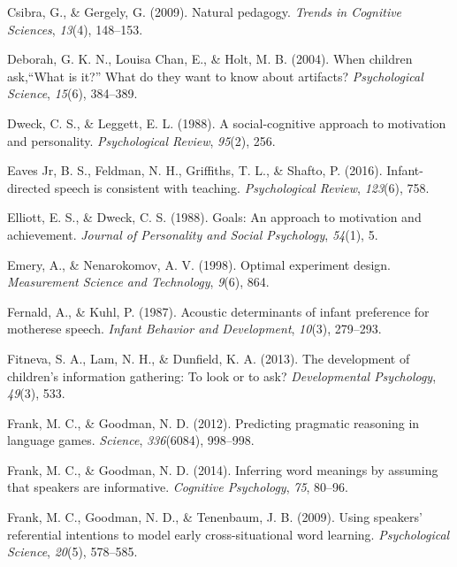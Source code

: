 \documentclass[oneside]{report}
\begin{document}
\leavevmode\hypertarget{ref-csibra2009natural}{}%
Csibra, G., \& Gergely, G. (2009). Natural pedagogy. \emph{Trends in
Cognitive Sciences}, \emph{13}(4), 148--153.

\leavevmode\hypertarget{ref-deborah2004children}{}%
Deborah, G. K. N., Louisa Chan, E., \& Holt, M. B. (2004). When children
ask,``What is it?'' What do they want to know about artifacts?
\emph{Psychological Science}, \emph{15}(6), 384--389.

\leavevmode\hypertarget{ref-dweck1988social}{}%
Dweck, C. S., \& Leggett, E. L. (1988). A social-cognitive approach to
motivation and personality. \emph{Psychological Review}, \emph{95}(2),
256.

\leavevmode\hypertarget{ref-eaves2016infant}{}%
Eaves Jr, B. S., Feldman, N. H., Griffiths, T. L., \& Shafto, P. (2016).
Infant-directed speech is consistent with teaching. \emph{Psychological
Review}, \emph{123}(6), 758.

\leavevmode\hypertarget{ref-elliott1988goals}{}%
Elliott, E. S., \& Dweck, C. S. (1988). Goals: An approach to motivation
and achievement. \emph{Journal of Personality and Social Psychology},
\emph{54}(1), 5.

\leavevmode\hypertarget{ref-emery1998optimal}{}%
Emery, A., \& Nenarokomov, A. V. (1998). Optimal experiment design.
\emph{Measurement Science and Technology}, \emph{9}(6), 864.

\leavevmode\hypertarget{ref-fernald1987acoustic}{}%
Fernald, A., \& Kuhl, P. (1987). Acoustic determinants of infant
preference for motherese speech. \emph{Infant Behavior and Development},
\emph{10}(3), 279--293.

\leavevmode\hypertarget{ref-fitneva2013development}{}%
Fitneva, S. A., Lam, N. H., \& Dunfield, K. A. (2013). The development
of children's information gathering: To look or to ask?
\emph{Developmental Psychology}, \emph{49}(3), 533.

\leavevmode\hypertarget{ref-frank2012predicting}{}%
Frank, M. C., \& Goodman, N. D. (2012). Predicting pragmatic reasoning
in language games. \emph{Science}, \emph{336}(6084), 998--998.

\leavevmode\hypertarget{ref-frank2014inferring}{}%
Frank, M. C., \& Goodman, N. D. (2014). Inferring word meanings by
assuming that speakers are informative. \emph{Cognitive Psychology},
\emph{75}, 80--96.

\leavevmode\hypertarget{ref-frank2009using}{}%
Frank, M. C., Goodman, N. D., \& Tenenbaum, J. B. (2009). Using
speakers' referential intentions to model early cross-situational word
learning. \emph{Psychological Science}, \emph{20}(5), 578--585.
\end{document}
